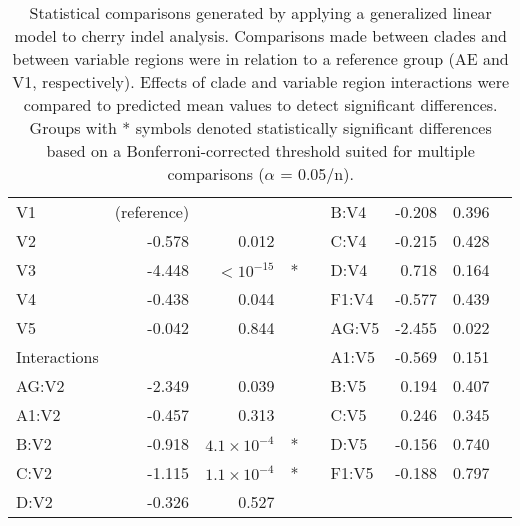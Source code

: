 \documentclass[12pt]{article}
\providecommand{\DIFadd}[1]{{\protect\color{blue}\uwave{#1}}} %
\providecommand{\DIFaddFL}[1]{\DIFadd{#1}} %
\providecommand{\DIFaddbeginFL}{} %
\providecommand{\DIFaddendFL}{} %
\newcommand{\DIFaddincludegraphics}[2][]{{\color{blue}\fbox{\DIFOincludegraphics[#1]{#2}}}} %
\DeclareRobustCommand{\DIFaddbeginFL}{\DIFOaddbeginFL \let\includegraphics\DIFaddincludegraphics} %
\DeclareRobustCommand{\DIFaddendFL}{\DIFOaddendFL \let\includegraphics\DIFOincludegraphics} %
\begin{document}
\begin{table}[htbp]
\begin{tabular}{lrrcclrrc}
  \hspace{1em}V1 & (reference) & & & &\hspace{1em}B:V4 & -0.208 & 0.396 & \\
  \hspace{1em}V2 & -0.578 & 0.012 &  & &\hspace{1em}C:V4 & -0.215 & 0.428 & \\ 
  \hspace{1em}V3 & -4.448 & $<10^{-15}$ & * &  &\hspace{1em}D:V4 & 0.718 & 0.164 &\\ 
  \hspace{1em}V4 & -0.438 & 0.044 & & &\hspace{1em}F1:V4 & -0.577 & 0.439 &  \\ 
  \hspace{1em}V5 & -0.042 & 0.844 & & &\hspace{1em}\DIFaddbeginFL \DIFaddFL{02\_}\DIFaddendFL AG:V5 & -2.455 & 0.022 & \\ 
  Interactions & & & &&\hspace{1em}A1:V5 & -0.569 & 0.151 & \\ 
  \hspace{1em}\DIFaddbeginFL \DIFaddFL{02\_}\DIFaddendFL AG:V2 & -2.349 & 0.039 & & &\hspace{1em}B:V5 & 0.194 & 0.407 & \\ 
  \hspace{1em}A1:V2 & -0.457 & 0.313 &  &&\hspace{1em}C:V5 & 0.246 & 0.345 & \\ 
  \hspace{1em}B:V2 & -0.918 & $4.1\times 10^{-4}$& * & &\hspace{1em}D:V5 & -0.156 & 0.740 & \\ 
  \hspace{1em}C:V2 & -1.115 & $1.1\times 10^{-4}$ & * & &\hspace{1em}F1:V5 & -0.188 & 0.797 & \\ 
  \hspace{1em}D:V2 & -0.326 & 0.527 &  & &\\  

  \hline
  \end{tabular}

  \caption{
    Statistical comparisons generated by applying a generalized linear model to cherry indel analysis. 
    Comparisons made between clades and between variable regions were in relation to a reference group (\DIFaddbeginFL \DIFaddFL{01\_}\DIFaddendFL AE and V1, respectively). 
    Effects of clade and variable region interactions were compared to predicted mean values to detect significant differences. 
    Groups with * symbols denoted statistically significant differences based on a Bonferroni-corrected threshold suited for multiple comparisons ($\alpha$ = 0.05/n). 
    }
    \label{tab:glm}
\end{table}
\end{document}
